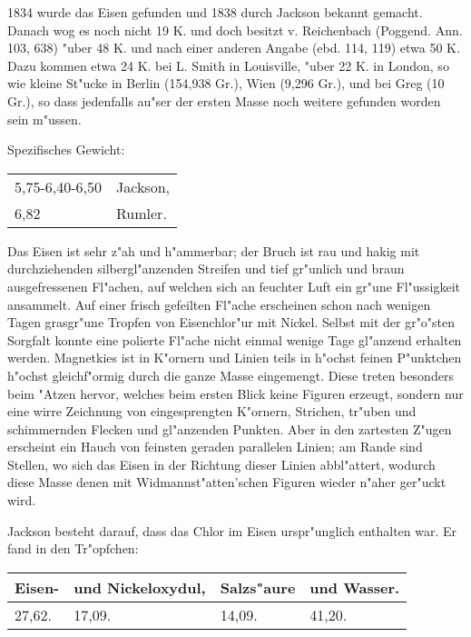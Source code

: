 \documentclass[a4paper, 11pt, oneside]{article}
\begin{document}
1834 wurde das Eisen gefunden und 1838 durch Jackson bekannt gemacht. Danach wog es noch nicht 19 K. und doch besitzt v. Reichenbach (Poggend. Ann. 103, 638) "uber 48 K. und nach einer anderen Angabe (ebd. 114, 119) etwa 50 K. Dazu kommen etwa 24 K. bei L. Smith in Louisville, "uber 22 K. in London, so wie kleine St"ucke in Berlin (154,938 Gr.), Wien (9,296 Gr.), und bei Greg (10 Gr.), so dass jedenfalls au"ser der ersten Masse noch weitere gefunden worden sein m"ussen.

Spezifisches Gewicht:
\begin{table}[!ht]
    \centering
    \begin{tabular}{l l}
        5,75-6,40-6,50 & Jackson,\\
        6,82 & Rumler.
    \end{tabular}
\end{table}

Das Eisen ist sehr z"ah und h"ammerbar; der Bruch ist rau und hakig mit durchziehenden silbergl"anzenden Streifen und tief gr"unlich und braun ausgefressenen Fl"achen, auf welchen sich an feuchter Luft ein gr"une Fl"ussigkeit ansammelt. Auf einer frisch gefeilten Fl"ache erscheinen schon nach wenigen Tagen grasgr"une Tropfen von Eisenchlor"ur mit Nickel. Selbst mit der gr"o"sten Sorgfalt konnte eine polierte Fl"ache nicht einmal wenige Tage gl"anzend erhalten werden. Magnetkies ist in K"ornern und Linien teils in h"ochst feinen P"unktchen h"ochst gleichf"ormig durch die ganze Masse eingemengt. Diese treten besonders beim "Atzen hervor, welches beim ersten Blick keine Figuren erzeugt, sondern nur eine wirre Zeichnung von eingesprengten K"ornern, Strichen, tr"uben und schimmernden Flecken und gl"anzenden Punkten. Aber in den zartesten Z"ugen erscheint ein Hauch von feinsten geraden parallelen Linien; am Rande sind Stellen, wo sich das Eisen in der Richtung dieser Linien abbl"attert, wodurch diese Masse denen mit Widmannst"atten'schen Figuren wieder n"aher ger"uckt wird.

Jackson besteht darauf, dass das Chlor im Eisen urspr"unglich enthalten war. Er fand in den Tr"opfchen:
\begin{table}[H]
    \centering
    \begin{tabular}{l l l l}
        Eisen- & und Nickeloxydul, & Salzs"aure & und Wasser. \\ \hline
        27,62. & 17,09. & 14,09. & 41,20. \\
    \end{tabular}
\end{table}
\end{document}
